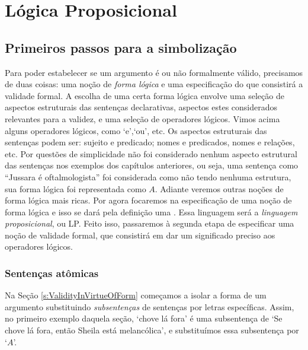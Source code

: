 \normalsize
\part{Lógica Proposicional}
\label{ch.TFL}

\chapter{Primeiros passos para a simbolização}

Para poder estabelecer se um argumento é ou não formalmente válido, precisamos de duas coisas: uma noção de \emph{forma lógica}  e uma especificação do que consistirá a validade formal. 
A escolha de uma certa forma lógica envolve uma seleção de aspectos estruturais das sentenças declarativas, aspectos estes considerados relevantes para a validez, e uma seleção de operadores lógicos.
Vimos acima alguns operadores lógicos, como `e',`ou', etc. 
Os aspectos estruturais das sentenças podem ser: sujeito e predicado; nomes e predicados, nomes e relações, etc.  
Por questões de simplicidade não foi considerado nenhum aspecto estrutural das sentenças nos exemplos dos capítulos anteriores, ou seja, uma sentença como ``Jussara é oftalmologista'' foi considerada como não tendo nenhuma estrutura, sua forma lógica foi representada como $A$.
Adiante veremos outras noções de forma lógica mais ricas.
Por agora focaremos na especificação de uma noção de forma lógica e isso se dará pela definição uma .
Essa linguagem será a \emph{linguagem proposicional}, ou LP.
Feito isso, passaremos à segunda etapa de especificar uma noção de validade formal, que consistirá em dar um significado preciso aos operadores lógicos.



\section{Sentenças atômicas}

Na Seção \ref{s:ValidityInVirtueOfForm} começamos a isolar a forma de um argumento substituindo \emph{subsentenças} de sentenças por letras específicas.
Assim, no primeiro exemplo daquela seção, `chove lá fora' é uma subsentença de `Se chove lá fora, então Sheila está melancólica', e substituímos essa subsentença por `$A$'.

